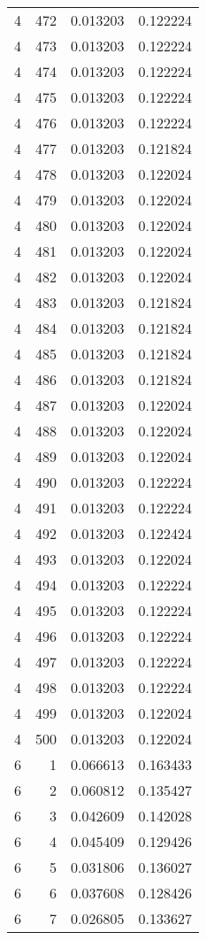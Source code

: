 \begin{longtable}{rrrr}
4 & 472 & 0.013203 & 0.122224 \\
4 & 473 & 0.013203 & 0.122224 \\
4 & 474 & 0.013203 & 0.122224 \\
4 & 475 & 0.013203 & 0.122224 \\
4 & 476 & 0.013203 & 0.122224 \\
4 & 477 & 0.013203 & 0.121824 \\
4 & 478 & 0.013203 & 0.122024 \\
4 & 479 & 0.013203 & 0.122024 \\
4 & 480 & 0.013203 & 0.122024 \\
4 & 481 & 0.013203 & 0.122024 \\
4 & 482 & 0.013203 & 0.122024 \\
4 & 483 & 0.013203 & 0.121824 \\
4 & 484 & 0.013203 & 0.121824 \\
4 & 485 & 0.013203 & 0.121824 \\
4 & 486 & 0.013203 & 0.121824 \\
4 & 487 & 0.013203 & 0.122024 \\
4 & 488 & 0.013203 & 0.122024 \\
4 & 489 & 0.013203 & 0.122024 \\
4 & 490 & 0.013203 & 0.122224 \\
4 & 491 & 0.013203 & 0.122224 \\
4 & 492 & 0.013203 & 0.122424 \\
4 & 493 & 0.013203 & 0.122024 \\
4 & 494 & 0.013203 & 0.122224 \\
4 & 495 & 0.013203 & 0.122224 \\
4 & 496 & 0.013203 & 0.122224 \\
4 & 497 & 0.013203 & 0.122224 \\
4 & 498 & 0.013203 & 0.122224 \\
4 & 499 & 0.013203 & 0.122024 \\
4 & 500 & 0.013203 & 0.122024 \\
6 & 1 & 0.066613 & 0.163433 \\
6 & 2 & 0.060812 & 0.135427 \\
6 & 3 & 0.042609 & 0.142028 \\
6 & 4 & 0.045409 & 0.129426 \\
6 & 5 & 0.031806 & 0.136027 \\
6 & 6 & 0.037608 & 0.128426 \\
6 & 7 & 0.026805 & 0.133627 \\

\end{longtable}
